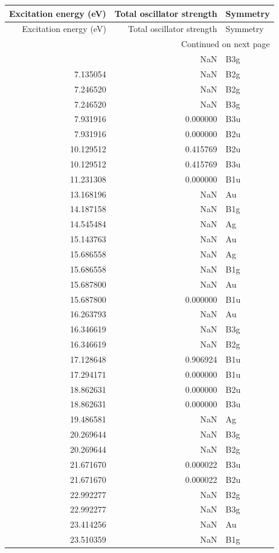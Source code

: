 \begin{longtable}{rrl}
\toprule
Excitation energy (eV) & Total oscillator strength & Symmetry \\
\midrule
\endfirsthead
\toprule
Excitation energy (eV) & Total oscillator strength & Symmetry \\
\midrule
\endhead
\midrule
\multicolumn{3}{r}{Continued on next page} \\
\midrule
\endfoot
\bottomrule
\endlastfoot
7.135054 & NaN & B3g \\
7.135054 & NaN & B2g \\
7.246520 & NaN & B2g \\
7.246520 & NaN & B3g \\
7.931916 & 0.000000 & B3u \\
7.931916 & 0.000000 & B2u \\
10.129512 & 0.415769 & B2u \\
10.129512 & 0.415769 & B3u \\
11.231308 & 0.000000 & B1u \\
13.168196 & NaN & Au \\
14.187158 & NaN & B1g \\
14.545484 & NaN & Ag \\
15.143763 & NaN & Au \\
15.686558 & NaN & Ag \\
15.686558 & NaN & B1g \\
15.687800 & NaN & Au \\
15.687800 & 0.000000 & B1u \\
16.263793 & NaN & Au \\
16.346619 & NaN & B3g \\
16.346619 & NaN & B2g \\
17.128648 & 0.906924 & B1u \\
17.294171 & 0.000000 & B1u \\
18.862631 & 0.000000 & B2u \\
18.862631 & 0.000000 & B3u \\
19.486581 & NaN & Ag \\
20.269644 & NaN & B3g \\
20.269644 & NaN & B2g \\
21.671670 & 0.000022 & B3u \\
21.671670 & 0.000022 & B2u \\
22.992277 & NaN & B2g \\
22.992277 & NaN & B3g \\
23.414256 & NaN & Au \\
23.510359 & NaN & B1g \\

\end{longtable}
